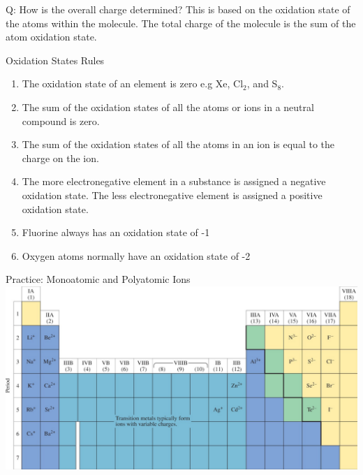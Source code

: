 \documentclass[11pt]{beamer}
\begin{document}
\begin{frame}{Q: How is the overall charge determined?}
  This is based on the oxidation state of the atoms within
  the molecule. The total charge of the molecule is the sum of
  the atom oxidation state.
\end{frame}

\begin{frame}{Oxidation States Rules}
  \begin{enumerate}
  \item The oxidation state of an element is zero e.g  Xe, Cl$_2$, and S$_8$.
  \item The sum of the oxidation states of all the atoms or ions in a
    neutral compound is zero.
  \item The sum of the oxidation states of all the atoms in an ion is
    equal to the charge on the ion.
  \item The more electronegative element in a substance is assigned a
    negative oxidation state. The less electronegative element is assigned
    a positive oxidation state.
  \item Fluorine always has an oxidation state of -1
  \item Oxygen atoms normally have an oxidation state of -2
  \end{enumerate}
\end{frame}

\begin{frame}{Practice: Monoatomic and Polyatomic Ions}
  \centering
  \includegraphics[width=\linewidth]{monoatomic_ion}
\end{frame}
\end{document}
